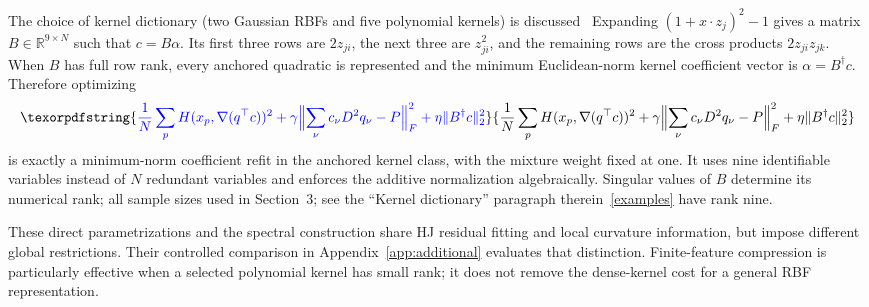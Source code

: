 \documentclass[11pt]{article}
\theoremstyle{plain}      %
\theoremstyle{definition} %
\providecommand{\DIFaddtex}[1]{{\protect\color{blue}#1}} %
\providecommand{\DIFdeltex}[1]{{\protect\color{red}#1}} %
\providecommand{\DIFaddbegin}{} %
\providecommand{\DIFaddend}{} %
\providecommand{\DIFdelbegin}{} %
\providecommand{\DIFdelend}{} %
\providecommand{\DIFadd}[1]{\texorpdfstring{\DIFaddtex{#1}}{#1}} %
\providecommand{\DIFdel}[1]{\texorpdfstring{\DIFdeltex{#1}}{}} %
\newcommand{\DIFscaledelfig}{1.0}
\newlength{\DIFdelgraphicswidth} %
\newlength{\DIFdelgraphicsheight} %
\newcommand{\DIFaddincludegraphics}[2][]{{\color{blue}\fbox{\DIFOincludegraphics[#1]{#2}}}} %
\newcommand{\DIFdelincludegraphics}[2][]{%
\sbox{\DIFdelgraphicsbox}{\DIFOincludegraphics[#1]{#2}}%
\settoboxwidth{\DIFdelgraphicswidth}{\DIFdelgraphicsbox} %
\settoboxtotalheight{\DIFdelgraphicsheight}{\DIFdelgraphicsbox} %
\scalebox{\DIFscaledelfig}{%
\parbox[b]{\DIFdelgraphicswidth}{\usebox{\DIFdelgraphicsbox}\\[-\baselineskip] \rule{\DIFdelgraphicswidth}{0em}}\llap{\resizebox{\DIFdelgraphicswidth}{\DIFdelgraphicsheight}{%
\setlength{\unitlength}{\DIFdelgraphicswidth}%
\begin{picture}(1,1)%
\thicklines\linethickness{2pt} %
{\color[rgb]{1,0,0}\put(0,0){\framebox(1,1){}}}%
{\color[rgb]{1,0,0}\put(0,0){\line( 1,1){1}}}%
{\color[rgb]{1,0,0}\put(0,1){\line(1,-1){1}}}%
\end{picture}%
}\hspace*{3pt}}} %
} %
\DeclareRobustCommand{\DIFaddbegin}{\DIFOaddbegin \let\includegraphics\DIFaddincludegraphics} %
\DeclareRobustCommand{\DIFaddend}{\DIFOaddend \let\includegraphics\DIFOincludegraphics} %
\DeclareRobustCommand{\DIFdelbegin}{\DIFOdelbegin \let\includegraphics\DIFdelincludegraphics} %
\DeclareRobustCommand{\DIFdelend}{\DIFOaddend \let\includegraphics\DIFOincludegraphics} %
\begin{document}
\DIFdel{The choice of kernel dictionary (two Gaussian RBFs and five polynomial kernels) is discussed }\DIFdelend\ \DIFaddbegin \DIFadd{Expanding $(1+x\cdot z_j)^2-1$ gives a matrix $B\in\mathbb R^{9\times N}$ such that $c=B\alpha$. Its first three rows are $2z_{ji}$, the next three are $z_{ji}^2$, and the remaining rows are the cross products $2z_{ji}z_{jk}$. When $B$ has full row rank, every anchored quadratic is represented and the minimum Euclidean-norm kernel coefficient vector is $\alpha=B^\dagger c$. Therefore optimizing
}\[
 \DIFadd{\frac{1}N\sum_p H(x_p,\nabla(q^\top c))^2
 +\gamma\Bigl\|\sum_\nu c_\nu D^2q_\nu-P\Bigr\|_F^2
 +\eta\|B^\dagger c\|_2^2
}\]
\DIFadd{is exactly a minimum-norm coefficient refit in the anchored kernel class, with the mixture weight fixed at one. It uses nine identifiable variables instead of $N$ redundant variables and enforces the additive normalization algebraically. Singular values of $B$ determine its numerical rank; all sample sizes used }\DIFaddend in Section~\DIFdelbegin \DIFdel{3; see the ``Kernel dictionary'' paragraph therein}\DIFdelend\ \DIFaddbegin \DIFadd{\ref{examples} have rank nine.
}

\DIFadd{These direct parametrizations and the spectral construction share HJ residual fitting and local curvature information, but impose different global restrictions. Their controlled comparison in Appendix~\ref{app:additional} evaluates that distinction. Finite-feature compression is particularly effective when a selected polynomial kernel has small rank; it does not remove the dense-kernel cost for a general RBF representation}\DIFaddend .
\end{document}
